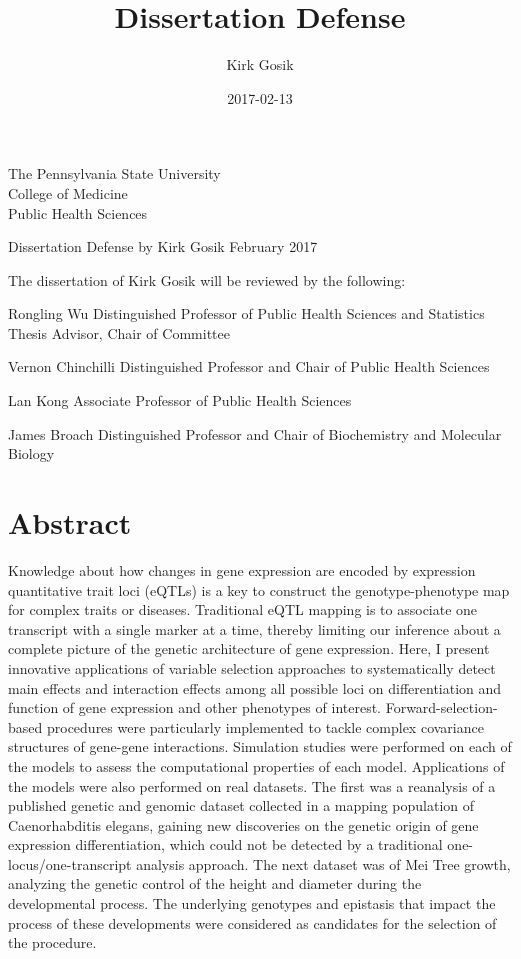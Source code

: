 \documentclass[11pt,]{book}
\title{Dissertation Defense}
\author{Kirk Gosik}
\date{2017-02-13}
\theoremstyle{definition}
\theoremstyle{definition}
\theoremstyle{remark}
\begin{document}
\maketitle

\center
The Pennsylvania State University \\
College of Medicine \\
Public Health Sciences

Dissertation Defense by Kirk Gosik
February 2017


The dissertation of Kirk Gosik will be reviewed by the following:

Rongling Wu
Distinguished Professor of Public Health Sciences and Statistics
Thesis Advisor, Chair of Committee

Vernon Chinchilli
Distinguished Professor and Chair of Public Health Sciences


Lan Kong
Associate Professor of Public Health Sciences

James Broach
Distinguished Professor and Chair of Biochemistry and Molecular Biology

{
\setcounter{tocdepth}{1}
\tableofcontents
}
\listoftables
\listoffigures
\chapter*{Abstract}\label{abstract}

Knowledge about how changes in gene expression are encoded by expression
quantitative trait loci (eQTLs) is a key to construct the
genotype-phenotype map for complex traits or diseases. Traditional eQTL
mapping is to associate one transcript with a single marker at a time,
thereby limiting our inference about a complete picture of the genetic
architecture of gene expression. Here, I present innovative applications
of variable selection approaches to systematically detect main effects
and interaction effects among all possible loci on differentiation and
function of gene expression and other phenotypes of interest.
Forward-selection-based procedures were particularly implemented to
tackle complex covariance structures of gene-gene interactions.
Simulation studies were performed on each of the models to assess the
computational properties of each model. Applications of the models were
also performed on real datasets. The first was a reanalysis of a
published genetic and genomic dataset collected in a mapping population
of Caenorhabditis elegans, gaining new discoveries on the genetic origin
of gene expression differentiation, which could not be detected by a
traditional one-locus/one-transcript analysis approach. The next dataset
was of Mei Tree growth, analyzing the genetic control of the height and
diameter during the developmental process. The underlying genotypes and
epistasis that impact the process of these developments were considered
as candidates for the selection of the procedure.
\end{document}
